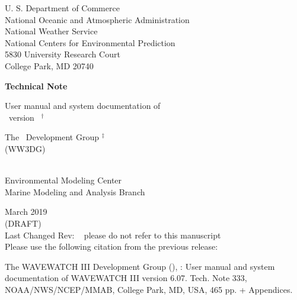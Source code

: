 
\pagestyle{empty}

\begin{center} 
U. S. Department of Commerce \\
National Oceanic and Atmospheric Administration \\
National Weather Service \\
National Centers for Environmental Prediction \\
5830 University Research Court \\
College Park, MD 20740


\vspace{15mm}

{\bf Technical Note}

\vspace{15mm}

{\large User manual and system documentation of \\
\ww\ version \WWver\ $^\dag$} \\

\vspace{15mm}

The \ww\ Development Group $^\ddag$ \\
(WW3DG)\\
\strut \\
Environmental Modeling Center \\
Marine Modeling and Analysis Branch

\vfill

 March 2019 \\
(DRAFT) \\
Last Changed Rev: \SVNRevision\ %
\vspace{\baselineskip}
{\sc please do not refer to this manuscript} \\
Please use the following citation from the previous release: 
\end{center}
\noindent The WAVEWATCH III\textsuperscript{\textregistered} Development Group (), \citeyearpar{ww3man2019}: User manual and system documentation of  WAVEWATCH III\textsuperscript{\textregistered} version 6.07. Tech. Note 333, NOAA/NWS/NCEP/MMAB, College Park, MD, USA, 465 pp. + Appendices. 

